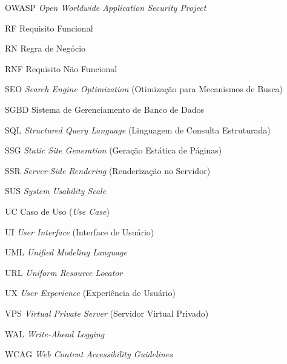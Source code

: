\begin{siglas}
	\item[OWASP] \textit{Open Worldwide Application Security Project}
	\item[RF] Requisito Funcional
	\item[RN] Regra de Negócio
	\item[RNF] Requisito Não Funcional
	\item[SEO] \textit{Search Engine Optimization} (Otimização para Mecanismos de Busca)
	\item[SGBD] Sistema de Gerenciamento de Banco de Dados
	\item[SQL] \textit{Structured Query Language} (Linguagem de Consulta Estruturada)
	\item[SSG] \textit{Static Site Generation} (Geração Estática de Páginas)
	\item[SSR] \textit{Server-Side Rendering} (Renderização no Servidor)
	\item[SUS] \textit{System Usability Scale}
	\item[UC] Caso de Uso (\textit{Use Case})
	\item[UI] \textit{User Interface} (Interface de Usuário)
	\item[UML] \textit{Unified Modeling Language}
	\item[URL] \textit{Uniform Resource Locator}
	\item[UX] \textit{User Experience} (Experiência de Usuário)
	\item[VPS] \textit{Virtual Private Server} (Servidor Virtual Privado)
	\item[WAL] \textit{Write-Ahead Logging}
	\item[WCAG] \textit{Web Content Accessibility Guidelines}
\end{siglas}
